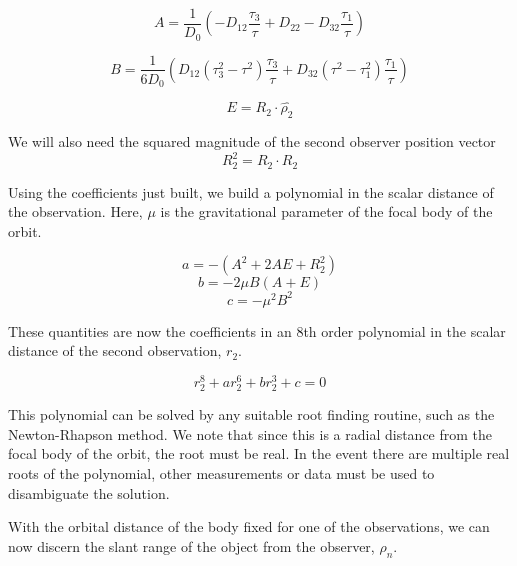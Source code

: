 \documentclass[11pt,twoside,letterpaper]{article}
\begin{document}
  \begin{equation}
    A = \frac{1}{D_0}\left( -D_{12}\frac{\tau_3}{\tau} + D_{22} -D_{32}\frac{\tau_1}{\tau}\right)
  \end{equation}

  \begin{equation}
    B = \frac{1}{6D_0}\left( D_{12}\left(\tau_3^2 - \tau^2 \right)\frac{\tau_3}{\tau}
    + D_{32}\left(\tau^2 - \tau_1^2\right)\frac{\tau_1}{\tau} \right)
  \end{equation}

  \begin{equation}
    E = R_2\cdot\hat{\rho_2}
  \end{equation}

  We will also need the squared magnitude of the second observer position vector
  \begin{equation}
    R_2^2 = R_2\cdot R_2
  \end{equation}

  Using the coefficients just built, we build a polynomial in the
  scalar distance of the observation. Here, $\mu$ is the gravitational
  parameter of the focal body of the orbit. 

  \begin{equation}
    a = -\left(A^2 + 2AE + R_2^2 \right)
  \end{equation}
  \begin{equation}
    b = -2\mu B\left(A+E \right)
  \end{equation}
  \begin{equation}
    c = -{\mu}^2B^2
  \end{equation}

  These quantities are now the coefficients in an 8th order polynomial
  in the scalar distance of the second observation, $r_2$.

  \begin{equation}
    r_2^8 + ar_2^6 + br_2^3 + c = 0
  \end{equation}

  This polynomial can be solved by any suitable root finding routine,
  such as the Newton-Rhapson method. We note that since this is a
  radial distance from the focal body of the orbit, the root must be
  real. In the event there are multiple real roots of the polynomial,
  other measurements or data must be used to disambiguate the solution.

  With the orbital distance of the body fixed for one of the
  observations, we can now discern the slant range of the object from
  the observer, $\rho_n$.
\end{document}
